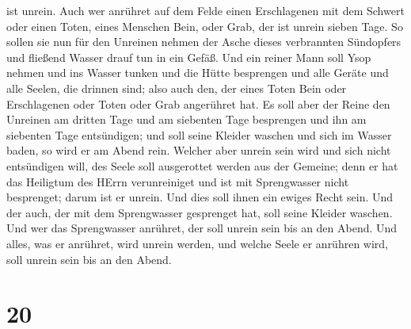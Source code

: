 ist unrein.  Auch wer anrühret auf dem Felde einen
Erschlagenen mit dem Schwert oder einen Toten, eines Menschen Bein, oder
Grab, der ist unrein sieben Tage.  So sollen sie nun für
den Unreinen nehmen der Asche dieses verbrannten Sündopfers und fließend
Wasser drauf tun in ein Gefäß.  Und ein reiner Mann soll
Ysop nehmen und ins Wasser tunken und die Hütte besprengen und alle
Geräte und alle Seelen, die drinnen sind; also auch den, der eines Toten
Bein oder Erschlagenen oder Toten oder Grab angerühret hat.
 Es soll aber der Reine den Unreinen am dritten Tage und am
siebenten Tage besprengen und ihn am siebenten Tage entsündigen; und
soll seine Kleider waschen und sich im Wasser baden, so wird er am Abend
rein.  Welcher aber unrein sein wird und sich nicht
entsündigen will, des Seele soll ausgerottet werden aus der Gemeine;
denn er hat das Heiligtum des HErrn verunreiniget und ist mit
Sprengwasser nicht besprenget; darum ist er unrein.  Und
dies soll ihnen ein ewiges Recht sein. Und der auch, der mit dem
Sprengwasser gesprenget hat, soll seine Kleider waschen. Und wer das
Sprengwasser anrühret, der soll unrein sein bis an den Abend.
 Und alles, was er anrühret, wird unrein werden, und welche
Seele er anrühren wird, soll unrein sein bis an den Abend.

\hypertarget{section-19}{%
\section{20}\label{section-19}}

